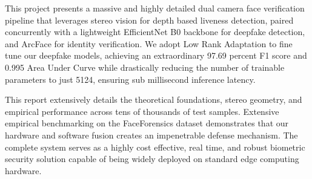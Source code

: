 \documentclass[12pt,a4paper]{report}
\begin{document}
This project presents a massive and highly detailed dual camera face verification pipeline that leverages stereo vision for depth based liveness detection, paired concurrently with a lightweight EfficientNet B0 backbone for deepfake detection, and ArcFace for identity verification. We adopt Low Rank Adaptation to fine tune our deepfake models, achieving an extraordinary 97.69 percent F1 score and 0.995 Area Under Curve while drastically reducing the number of trainable parameters to just 5124, ensuring sub millisecond inference latency. 

This report extensively details the theoretical foundations, stereo geometry, and empirical performance across tens of thousands of test samples. Extensive empirical benchmarking on the FaceForensics dataset demonstrates that our hardware and software fusion creates an impenetrable defense mechanism. The complete system serves as a highly cost effective, real time, and robust biometric security solution capable of being widely deployed on standard edge computing hardware.

\newpage

\tableofcontents

\newpage
\listoffigures
{}

\newpage
\listoftables
{}

\newpage
\end{document}
